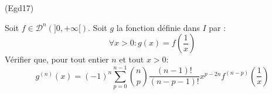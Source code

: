 \begin{tiny}(Egd17)\end{tiny} Soit $f\in \mathcal{D}^n(]0,+\infty[)$. Soit $g$ la fonction définie dans $I$ par :
\begin{displaymath}
 \forall x > 0 : g(x) = f(\frac{1}{x})
\end{displaymath}
 Vérifier que, pour tout entier $n$ et tout $x>0$:
\begin{displaymath}
 g^{(n)}(x)=
(-1)^n\sum_{p=0}^{n-1}\binom{n}{p}\frac{(n-1)!}{(n-p-1)!}x^{p-2n}f^{(n-p)}(\frac{1}{x})
\end{displaymath}

